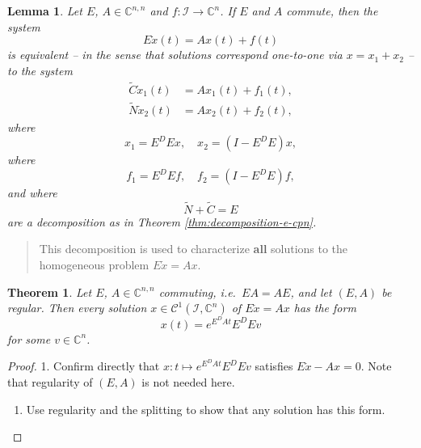 \documentclass[]{book}
\providecommand{\tightlist}{%
  \setlength{\itemsep}{0pt}\setlength{\parskip}{0pt}}
\newenvironment {JHSAYS} [0] {\begin{quote}\color{jhsc}} {\end{quote}}
\newtheorem{theorem}{Theorem}[chapter]
\newtheorem{lemma}{Lemma}[chapter]
\theoremstyle{definition}
\theoremstyle{definition}
\theoremstyle{definition}
\theoremstyle{definition}
\theoremstyle{remark}
\begin{document}
\begin{lemma}
\protect\hypertarget{lem:additive-split-dae-tntc}{}{\label{lem:additive-split-dae-tntc} }Let \(E\), \(A \in \mathbb C^{n,n}\) and \(f\colon \mathcal I \to \mathbb C^{n}\). If \(E\) and \(A\) commute, then the system
\[
E\dot x(t) = Ax(t) + f(t)
\]
is equivalent -- in the sense that solutions correspond one-to-one via \(x=x_1+x_2\) -- to the system
\begin{align*}
\tilde C \dot x_1(t) &= Ax_1(t) + f_1(t), \\
\tilde N \dot x_2(t) &= Ax_2(t) + f_2(t), 
\end{align*}
where
\begin{equation}
x_1 = E^{D}Ex, \quad x_2 = (I-E^{D}E)x,
\end{equation}
where
\begin{equation}
f_1 = E^{D}Ef, \quad f_2 = (I-E^{D}E)f,
\end{equation}
and where
\[
\tilde N + \tilde C = E
\]
are a decomposition as in Theorem \ref{thm:decomposition-e-cpn}.
\end{lemma}

\begin{JHSAYS}
This decomposition is used to characterize \textbf{all} solutions to the
homogeneous problem \(E\dot x = Ax\).
\end{JHSAYS}

\begin{theorem}
\protect\hypertarget{thm:exp-formula-homogeneous-problem}{}{\label{thm:exp-formula-homogeneous-problem} }Let \(E\), \(A \in \mathbb C^{n,n}\) commuting, i.e.~\(EA=AE\), and let \((E,A)\) be regular. Then every solution \(x\in \mathcal C^1(\mathcal I, \mathbb C^n)\) of \(E\dot x=Ax\) has the form
\begin{equation}
x(t) = e^{E^DAt}E^DEv
\end{equation}
for some \(v\in \mathbb C^n\).
\end{theorem}

\begin{proof}
{}
1. Confirm directly that \(x\colon t \mapsto e^{E^DAt}E^DEv\) satisfies \(E\dot x - Ax=0\). Note that regularity of \((E,A)\) is not needed here.

\begin{enumerate}
\def\labelenumi{\arabic{enumi}.}
\setcounter{enumi}{1}
\tightlist
\item
  Use regularity and the splitting to show that any solution has this form.
\end{enumerate}
\end{proof}
\end{document}
